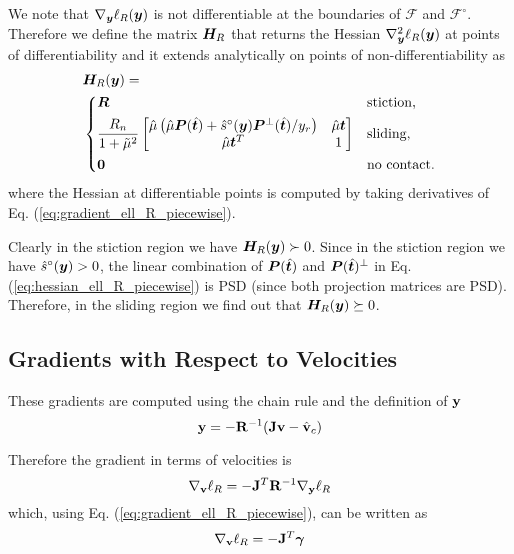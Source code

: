 We note that $\nabla_{\bm{y}}\ell_R({\bm{y}})$ is not differentiable at the
boundaries of $\mathcal{F}$ and $\mathcal{F}^\circ$. Therefore we define the
matrix ${\bm{H}}_R$ that returns the Hessian $\nabla_{\bm{y}}^2\ell_R({\bm{y}})$ at
points of differentiability and it extends analytically on points of
non-differentiability as
\begin{align}
	&\vf{H}_R(\vf{y}) = 
	\label{eq:hessian_ell_R_piecewise}\\
&\begin{dcases}
	\vf{R} & 
	\text{stiction,}\\
	\frac{R_n}{1+\tilde\mu^2}
	\begin{bmatrix}
		\hat{\mu}\left(\hat{\mu}\vf{P}(\hat{\vf{t}})+\hat{s}^\circ(\vf{y})\vf{P}^\perp(\hat{\vf{t}})/y_r\right) & 
		\hat{\mu}\vf{t}\\
		\hat{\mu}\vf{t}^T & 
		1\\
	\end{bmatrix} &
	\text{sliding,}\\
    \vf{0} & \text{no contact.}
\end{dcases}\nonumber
\end{align}
where the Hessian at differentiable points is computed by taking derivatives of
Eq. (\ref{eq:gradient_ell_R_piecewise}).

Clearly in the stiction region we have ${\bm{H}}_R({\bm{y}})\succ 0$.
Since in the stiction region we have $\hat{s}^\circ({\bm{y}})>0$, the linear
combination of ${\bm{P}}(\hat{{\bm{t}}})$ and ${\bm{P}}(\hat{{\bm{t}}})^\perp$ in Eq.
(\ref{eq:hessian_ell_R_piecewise}) is PSD (since both projection matrices are
PSD). Therefore, in the sliding region we find out that
${\bm{H}}_R({\bm{y}})\succeq 0$.

\subsection{Gradients with Respect to Velocities}
These gradients are computed using the chain rule and the definition of ${\mathbf{y}}$
\begin{equation*}
	{\mathbf{y}}=-{\mathbf{R}}^{-1}({\mathbf{J}}{\mathbf{v}} - \hat{{\mathbf{v}}}_c)
\end{equation*}

Therefore the gradient in terms of velocities is
\begin{equation}
	\nabla_\mf{v}\ell_R = -\mf{J}^T\mf{R}^{-1}\nabla_\mf{y}\ell_R
	\label{eq:ell_velocity_gradient}
\end{equation}
which, using Eq. (\ref{eq:gradient_ell_R_piecewise}), can be written as
\begin{equation}
	\nabla_\mf{v}\ell_R = -\mf{J}^T\bgamma
	\label{eq:ell_velocity_gradient_simplified}
\end{equation}

